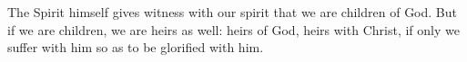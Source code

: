 \lettrine[lines=3]{T}{}he Spirit himself gives witness with our spirit that we are children of God. But if we are children, we are heirs as well: heirs of God, heirs with Christ, if only we suffer with him so as to be glorified with him.
